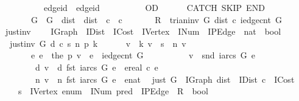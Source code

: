 \begin{isabellebody}
\ \ \ \ \ \ \ \ \ \ {\isasymacute}edge{\isacharunderscore}id\ {\isacharcolon}{\isacharequal}{\isacharequal}\ {\isasymacute}edge{\isacharunderscore}id\ {\isacharplus}\ {}\isanewline
\ \ \ \ \ \ \ \ OD\isanewline
\ \ \ \ \ \ CATCH\ SKIP\ END\isanewline
\ \ \ \ \ \ {\isasymlbrace}\ {\isasymacute}G\ {\isacharequal}\ G\ {\isasymand}\ {\isasymacute}dist\ {\isacharequal}\ dist\ {\isasymand}\ {\isasymacute}c\ {\isacharequal}\ c\isanewline
\ \ \ \ \ \ {\isasymand}\ {\isasymacute}R\ {\isacharequal}\ trian{\isacharunderscore}inv\ {\isasymacute}G\ {\isasymacute}dist\ {\isasymacute}c\ {\isacharparenleft}iedge{\isacharunderscore}cnt\ {\isasymacute}G{\isacharparenright}\ {\isasymrbrace}\isanewline
\ \ \ \ {\isachardoublequoteclose}\isanewline
\isanewline
{}\isamarkupfalse%
\ just{\isacharunderscore}inv\ {\isacharcolon}{\isacharcolon}\ \isanewline
\ \ {\isachardoublequoteopen}IGraph\ {\isasymRightarrow}\ IDist\ {\isasymRightarrow}\ ICost\ {\isasymRightarrow}\ IVertex\ {\isasymRightarrow}\ INum\ {\isasymRightarrow}\ IPEdge\ {\isasymRightarrow}\ nat\ {\isasymRightarrow}\ bool{\isachardoublequoteclose}\ \isanewline
\ \ {\isachardoublequoteopen}just{\isacharunderscore}inv\ G\ d\ c\ s\ n\ p\ k\ {\isasymequiv}\ \isanewline
\ \ \ \ {\isasymforall}v\ {\isacharless}\ k{\isachardot}\ v\ {\isasymnoteq}\ s\ {\isasymand}\ n\ v\ {\isasymnoteq}\ {\isasyminfinity}\ {\isasymlongrightarrow}\ \isanewline
\ \ \ \ \ \ {\isacharparenleft}{\isasymexists}\ e{\isachardot}\ e\ {\isacharequal}\ the\ {\isacharparenleft}p\ v{\isacharparenright}\ {\isasymand}\ e\ {\isacharless}\ iedge{\isacharunderscore}cnt\ G\ {\isasymand}\ \isanewline
\ \ \ \ \ \ \ \ v\ {\isacharequal}\ snd\ {\isacharparenleft}iarcs\ G\ e{\isacharparenright}\ {\isasymand}\isanewline
\ \ \ \ \ \ \ \ d\ v\ {\isacharequal}\ d\ {\isacharparenleft}fst\ {\isacharparenleft}iarcs\ G\ e{\isacharparenright}{\isacharparenright}\ {\isacharplus}\ ereal\ {\isacharparenleft}c\ e{\isacharparenright}\ {\isasymand}\isanewline
\ \ \ \ \ \ \ \ n\ v\ {\isacharequal}\ n\ {\isacharparenleft}fst\ {\isacharparenleft}iarcs\ G\ e{\isacharparenright}{\isacharparenright}\ {\isacharplus}\ {\isacharparenleft}enat\ {}{\isacharparenright}{\isacharparenright}{\isachardoublequoteclose}\isanewline
\isanewline
{}\isamarkupfalse%
\ just\ {\isacharparenleft}G\ {\isacharcolon}{\isacharcolon}\ IGraph{\isacharcomma}\ dist\ {\isacharcolon}{\isacharcolon}\ IDist{\isacharcomma}\ c\ {\isacharcolon}{\isacharcolon}\ ICost{\isacharcomma}\ \isanewline
\ \ \ \ s\ {\isacharcolon}{\isacharcolon}\ IVertex{\isacharcomma}\ enum\ {\isacharcolon}{\isacharcolon}\ INum{\isacharcomma}\ pred\ {\isacharcolon}{\isacharcolon}\ IPEdge\ {\isacharbar}\ R\ {\isacharcolon}{\isacharcolon}\ bool{\isacharparenright}\isanewline

\end{isabellebody}
